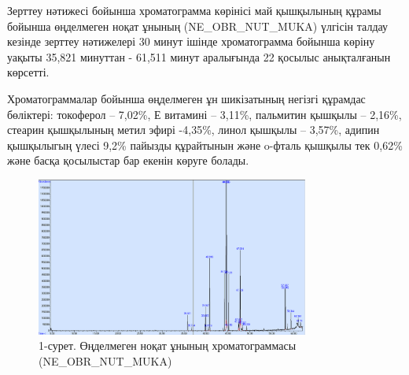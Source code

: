 \begin{multicols}{2}
Зерттеу нәтижесі бойынша хроматограмма көрінісі май қышқылының құрамы
бойынша өңделмеген ноқат ұнының (NE\_OBR\_NUT\_MUKA) үлгісін талдау
кезінде зерттеу нәтижелері 30 минут ішінде хроматограмма бойынша көріну
уақыты 35,821 минуттан - 61,511 минут аралығында 22 қосылыс анықталғанын
көрсетті.

Хроматограммалар бойынша өңделмеген ұн шикізатының негізгі құрамдас
бөліктері: токоферол -- 7,02\%, Е витамині -- 3,11\%, пальмитин қышқылы
-- 2,16\%, стеарин қышқылының метил эфирі -4,35\%, линол қышқылы --
3,57\%, адипин қышқылыгың үлесі 9,2\% пайызды құрайтынын және o-фталь
қышқылы тек 0,62\% және басқа қосылыстар бар екенін көруге болады.
\end{multicols}

\begin{figure}[H]
	\centering
	\includegraphics[width=0.8\textwidth]{media/pish/image13}
	\caption*{1-сурет. Өңделмеген ноқат ұнының хроматограммасы
	(NE\_OBR\_NUT\_MUKA)}
\end{figure}


